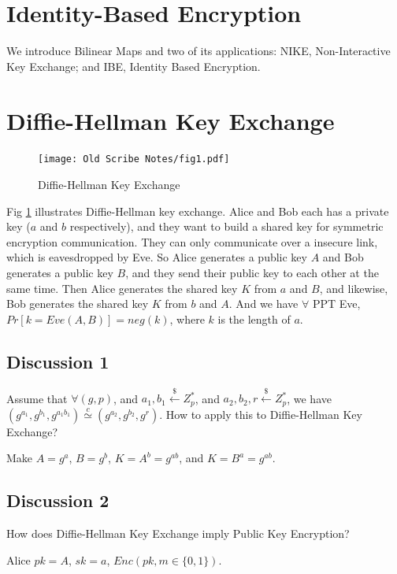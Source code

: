 \documentclass[12pt]{tufte-book}
\begin{document}
\section{Identity-Based Encryption}

We introduce Bilinear Maps and two of its applications: NIKE, Non-Interactive Key Exchange; and IBE, Identity Based Encryption.


\section{Diffie-Hellman Key Exchange}

\begin{figure}
\label{fig:dh}
\centering
  \texttt{[image: Old Scribe Notes/fig1.pdf]}
\caption{Diffie-Hellman Key Exchange}
\end{figure}


Fig \ref{fig:dh} illustrates Diffie-Hellman key exchange. Alice and Bob each has a private key ($a$ and $b$ respectively), and they want to build a shared key for symmetric encryption communication. They can only communicate over a insecure link, which is eavesdropped by Eve.
So Alice generates a public key $A$ and Bob generates a public key $B$, and they send their public key to each other at the same time. Then Alice generates the shared key $K$ from $a$ and $B$, and likewise, Bob generates the shared key $K$ from $b$ and $A$.
And we have $\forall$ PPT Eve, $Pr[k=Eve(A,B)]=neg(k)$, where $k$ is the length of $a$.


\subsection{Discussion 1}

Assume that $\forall (g, p)$, and $a_1,b_1 \stackrel{\$}{\gets} Z^*_p$, and $a_2,b_2,r \stackrel{\$}{\gets}Z^*_p$, we have $(g^{a_1}, g^{b_1}, g^{a_1b_1}) \stackrel{c}{\simeq} (g^{a_2}, g^{b_2}, g^r)$. How to apply this to Diffie-Hellman Key Exchange?


Make $A=g^a$, $B=g^b$, $K=A^b=g^{ab}$, and $K=B^a=g^{ab}$.


\subsection{Discussion 2}


How does Diffie-Hellman Key Exchange imply Public Key Encryption?


Alice
$pk = A$, $sk = a$, $Enc(pk, m \in \{0, 1\})$.
\end{document}
